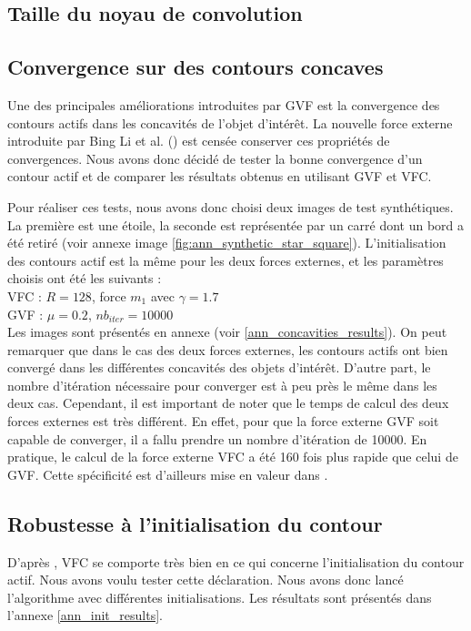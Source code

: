 \subsection{Taille du noyau de convolution}
\subsection{Convergence sur des contours concaves}
Une des principales améliorations introduites par GVF est la convergence des contours actifs dans les concavités de l'objet d'intérêt. La nouvelle force externe introduite par Bing Li et al. (\cite{vfc}) est censée conserver ces propriétés de convergences. Nous avons donc décidé de tester la bonne convergence d'un contour actif et de comparer les résultats obtenus en utilisant GVF et VFC.

Pour réaliser ces tests, nous avons donc choisi deux images de test synthétiques. La première est une étoile, la seconde est représentée par un carré dont un bord a été retiré (voir annexe image \ref{fig:ann_synthetic_star_square}). L'initialisation des contours actif est la même pour les deux forces externes, et les paramètres choisis ont été les suivants :\\

VFC : $R = 128$, force $m_{1}$ avec $\gamma = 1.7$\\
GVF : $\mu = 0.2$, $nb_{iter} = 10000$\\

Les images sont présentés en annexe (voir \ref{ann_concavities_results}). On peut remarquer que dans le cas des deux forces externes, les contours actifs ont bien convergé dans les différentes concavités des objets d'intérêt. D'autre part, le nombre d'itération nécessaire pour converger est à peu près le même dans les deux cas. Cependant, il est important de noter que le temps de calcul des deux forces externes est très différent. En effet, pour que la force externe GVF soit capable de converger, il a fallu prendre un nombre d'itération de 10000. En pratique, le calcul de la force externe VFC a été 160 fois plus rapide que celui de GVF. Cette spécificité est d'ailleurs mise en valeur dans \cite{vfc}. 

\subsection{Robustesse à l'initialisation du contour}
D'après \cite{vfc}, VFC se comporte très bien en ce qui concerne l'initialisation du contour actif. Nous avons voulu tester cette déclaration. Nous avons donc lancé l'algorithme avec différentes initialisations. Les résultats sont présentés dans l'annexe \ref{ann_init_results}.\\ 

